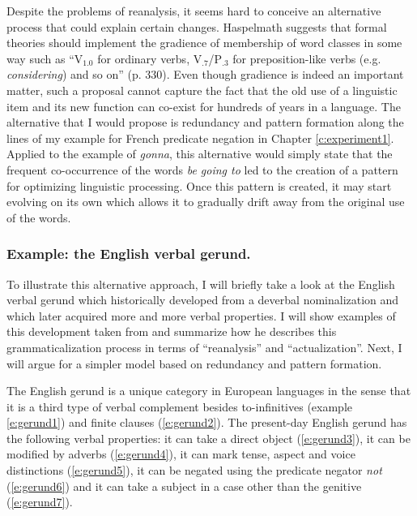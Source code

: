 Despite the problems of reanalysis, it seems hard to conceive an alternative process that could explain certain changes. Haspelmath suggests that formal theories should implement the gradience of membership of word classes in some way such as  ``V$_{1.0}$ for ordinary verbs, V$_{.7}$/P$_{.3}$ for preposition-like verbs (e.g. {\em considering\em}) and so on''  (p. 330). Even though gradience is indeed an important matter, such a proposal cannot capture the fact that the old use of a linguistic item and its new function can co-exist for hundreds of years in a language. The alternative that I would propose is  redundancy and pattern formation along the lines of my example for French predicate negation in Chapter \ref{c:experiment1}. Applied to the example of {\em gonna}, this alternative would simply state that the frequent co-occurrence of the words {\em be going to} led to the creation of a pattern for optimizing linguistic processing. Once this pattern is created, it may start evolving on its own which allows it to gradually drift away from the original use of the words.


\subsubsection{Example: the English verbal gerund.} 
To illustrate this alternative approach, I will briefly take a look at the English verbal gerund which historically developed from a deverbal nominalization and which later acquired more and more verbal properties. I will show examples of this development taken from \citet{fanego04reanalysis} and summarize how he describes this grammaticalization process in terms of ``reanalysis'' and ``actualization''. Next, I will argue for a simpler model based on  redundancy and pattern formation.

The English gerund is a unique category in European languages in the sense that it is a third type of verbal complement besides  to-infinitives (example \ref{e:gerund1}) and finite clauses (\ref{e:gerund2}). The present-day English gerund has the following verbal properties: it can take a direct object (\ref{e:gerund3}), it can be modified by adverbs (\ref{e:gerund4}), it can mark tense, aspect and voice distinctions (\ref{e:gerund5}), it can be negated using the predicate negator {\em not} (\ref{e:gerund6}) and it can take a subject in a case other than the genitive (\ref{e:gerund7}).

